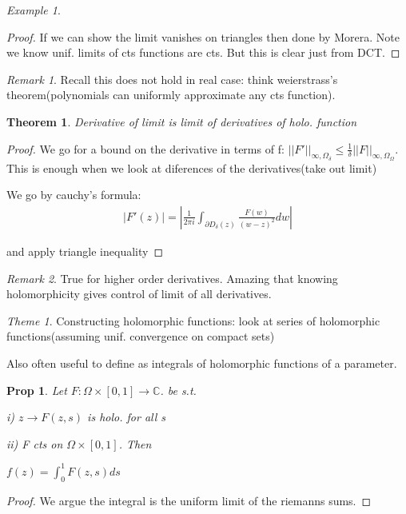 \documentclass[11pt]{article}
\newcommand{\C}{\mathbb{C}}
\newtheorem{theorem}{Theorem}
\newtheorem{prop}{Prop}
\theoremstyle{remark}
\newtheorem{remark}{Remark}
\newtheorem{theme}{Theme}
\newtheorem{example}{Example}
\begin{document}
\begin{example}
\begin{proof}
	If we can show the limit vanishes on triangles then done by Morera. Note we know unif. limits of cts functions are cts. But this is clear just from DCT.
\end{proof}

\begin{remark}
	Recall this does not hold in real case: think weierstrass's theorem(polynomials can uniformly approximate any cts function).
\end{remark}

\begin{theorem}
	Derivative of limit is limit of derivatives of holo. function
\end{theorem}

\begin{proof}
	We go for a bound on the derivative in terms of f: $||F'||_{\infty,\Omega_{\delta}} \leq \frac{1}{\delta}||F||_{\infty,\Omega_{\Omega}}$. This is enough when we look at diferences of the derivatives(take out limit)

	We go by cauchy's formula:
	\begin{align*}
		|F'(z)| = |\frac{1}{2\pi i}\int_{\partial D_{\delta}(z)}\frac{F(w)}{(w-z)^2}dw|
	\end{align*}

	and apply triangle inequality
\end{proof}

\begin{remark}
	True for higher order derivatives. Amazing that knowing holomorphicity gives control of limit of all derivatives. 
\end{remark}

\begin{theme}
	Constructing holomorphic functions: look at series of holomorphic functions(assuming unif. convergence on compact sets)

	Also often useful to define as integrals of holomorphic functions of a parameter.
\end{theme}

\begin{prop}
	Let $F : \Omega \times [0,1] \to \C$. be s.t. 

	i) $z \to F(z,s)$ is holo. for all s

	ii) F cts on $\Omega \times [0,1]$. Then 

	$f(z) = \int_0^1 F(z,s) ds $
\end{prop}

\begin{proof}
	We argue the integral is the uniform limit of the riemanns sums. 


\end{proof}
\end{example}
\end{document}
